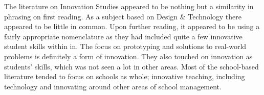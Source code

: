The literature on Innovation Studies appeared to be nothing but a similarity in phrasing on first reading. As a subject based on Design & Technology there appeared to be little in common. Upon further reading, it appeared to be using a fairly appropriate nomenclature as they had included quite a few innovative student skills within in. The focus on prototyping and solutions to real-world problems is definitely a form of innovation. They also touched on innovation as students' skills, which was not seen a lot in other areas. Most of the school-based literature tended to focus on schools as whole; innovative teaching, including technology and innovating around other areas of school management. 



\cite{StopI4:online}